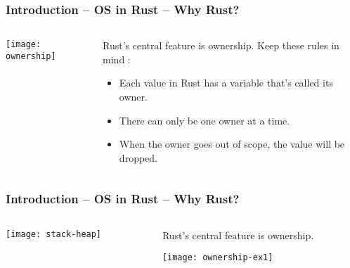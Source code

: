 \begin{frame}[plain]
	\frametitle{Introduction -- OS in Rust -- Why Rust?}
	
	
	
	\begin{columns}
		
		\begin{column}{.4\textwidth}
			
			\texttt{[image: ownership]}

		\end{column}
		
		\begin{column}{.6\textwidth}
			
			\Large
			
			Rust's central feature is ownership. 
			Keep these rules in mind :
			\begin{itemize}
				
				\item  Each value in Rust has a variable that’s called its owner.
				
				
				\item There can only be one owner at a time.
				
				\item When the owner goes out of scope, the value will be dropped.
				
				
			\end{itemize}
			
		\end{column}
		
		
	\end{columns}
	
	
\end{frame}


\begin{frame}[plain]
	\frametitle{Introduction -- OS in Rust -- Why Rust?}
	
	
	
	\begin{columns}
		
		\begin{column}{.3\textwidth}
			
			\texttt{[image: stack-heap]}
			
		\end{column}
		
		\begin{column}{.7\textwidth}
			
			\Large
			
			Rust's central feature is ownership. 

			\texttt{[image: ownership-ex1]}
			
		\end{column}
		
		
	\end{columns}
	
	
\end{frame}



